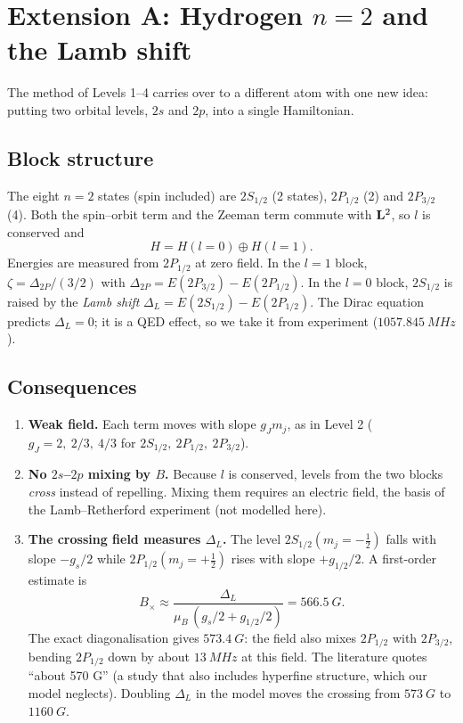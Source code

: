 \section{Extension A: Hydrogen $n=2$ and the Lamb shift}
The method of Levels 1--4 carries over to a different atom with one new idea: putting two
orbital levels, $2s$ and $2p$, into a single Hamiltonian.

\subsection{Block structure}
The eight $n=2$ states (spin included) are $2S_{1/2}$ (2 states), $2P_{1/2}$ (2) and $2P_{3/2}$ (4).
Both the spin--orbit term and the Zeeman term commute with $\vb{L}^2$, so $l$ is conserved and
\begin{equation}
  H = H(l{=}0) \oplus H(l{=}1).
\end{equation}
Energies are measured from $2P_{1/2}$ at zero field. In the $l=1$ block, $\zeta = \Delta_{2P}/(3/2)$
with $\Delta_{2P} = E(2P_{3/2}) - E(2P_{1/2})$. In the $l=0$ block, $2S_{1/2}$ is raised by the
\emph{Lamb shift} $\Delta_L = E(2S_{1/2}) - E(2P_{1/2})$. The Dirac equation predicts $\Delta_L = 0$;
it is a QED effect, so we take it from experiment ($1057.845\ \si{MHz}$).

\subsection{Consequences}
\begin{enumerate}
  \item \textbf{Weak field.} Each term moves with slope $g_J m_j$, as in Level 2
        ($g_J = 2,\ 2/3,\ 4/3$ for $2S_{1/2},\ 2P_{1/2},\ 2P_{3/2}$).
  \item \textbf{No $2s$--$2p$ mixing by $B$.} Because $l$ is conserved, levels from the two blocks
        \emph{cross} instead of repelling. Mixing them requires an electric field, the basis of the
        Lamb--Retherford experiment (not modelled here).
  \item \textbf{The crossing field measures $\Delta_L$.} The level $2S_{1/2}(m_j{=}-\tfrac12)$
        falls with slope $-g_s/2$ while $2P_{1/2}(m_j{=}+\tfrac12)$ rises with slope $+g_{1/2}/2$. A first-order estimate is
        \begin{equation}
          B_\times \approx \frac{\Delta_L}{\mu_B\,(g_s/2 + g_{1/2}/2)} = 566.5\ \si{G}.
        \end{equation}
        The exact diagonalisation gives $573.4\ \si{G}$: the field also mixes $2P_{1/2}$ with
        $2P_{3/2}$, bending $2P_{1/2}$ down by about $13\ \si{MHz}$ at this field. The literature quotes
        ``about 570 G'' (a study that also includes hyperfine structure, which our model neglects).
        Doubling $\Delta_L$ in the model moves the crossing from $573\ \si{G}$ to $1160\ \si{G}$.
\end{enumerate}

